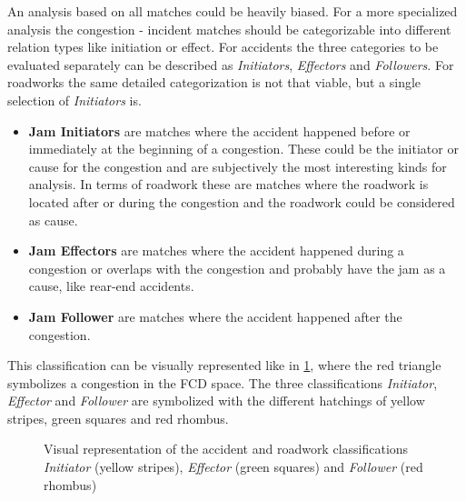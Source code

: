 An analysis based on all matches could be heavily biased. For a more specialized analysis the congestion - incident matches should be categorizable into different relation types like initiation or effect. For accidents the three categories to be evaluated separately can be described as \textit{Initiators}, \textit{Effectors} and \textit{Followers}. For roadworks the same detailed categorization is not that viable, but a single selection of \textit{Initiators} is.
\begin{itemize}
	\setlength\itemsep{0.1em}	
	\item[] \textbf{Jam Initiators} are matches where the accident happened before or immediately at the beginning of a congestion. These could be the initiator or cause for the congestion and are subjectively the most interesting kinds for analysis. In terms of roadwork these are matches where the roadwork is located after or during the congestion and the roadwork could be considered as cause.
	\item[] \textbf{Jam Effectors} are matches where the accident happened during a congestion or overlaps with the congestion and probably have the jam as a cause, like rear-end accidents.
	\item[] \textbf{Jam Follower} are matches where the accident happened after the congestion. 
\end{itemize}
This classification can be visually represented like in \cref{img:jam_classifation}, where the red triangle symbolizes a congestion in the FCD space. The three classifications \textit{Initiator}, \textit{Effector} and \textit{Follower} are symbolized with the different hatchings of yellow stripes, green squares and red rhombus.
\begin{figure}[htp]
	\centering
	\begin{minipage}{0.5\textwidth}
		\centering
		
		\label{fig:1a}
	\end{minipage}%
	\begin{minipage}{0.5\textwidth}
		\centering
		
		\label{fig:1b}
	\end{minipage}%
	\caption{Visual representation of the accident and roadwork classifications \textit{Initiator} (yellow stripes), \textit{Effector} (green squares) and \textit{Follower} (red rhombus)}
	\label{img:jam_classifation}
\end{figure}
